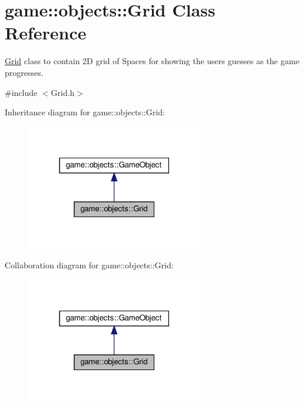 \hypertarget{classgame_1_1objects_1_1Grid}{}\section{game\+:\+:objects\+:\+:Grid Class Reference}
\label{classgame_1_1objects_1_1Grid}


\hyperlink{classgame_1_1objects_1_1Grid}{Grid} class to contain 2D grid of Spaces for showing the user\textquotesingle{}s guesses as the game progresses.  




{\ttfamily \#include $<$Grid.\+h$>$}



Inheritance diagram for game\+:\+:objects\+:\+:Grid\+:
\nopagebreak
\begin{figure}[H]
\begin{center}
\leavevmode
\includegraphics[width=219pt]{classgame_1_1objects_1_1Grid__inherit__graph}
\end{center}
\end{figure}


Collaboration diagram for game\+:\+:objects\+:\+:Grid\+:
\nopagebreak
\begin{figure}[H]
\begin{center}
\leavevmode
\includegraphics[width=219pt]{classgame_1_1objects_1_1Grid__coll__graph}
\end{center}
\end{figure}
